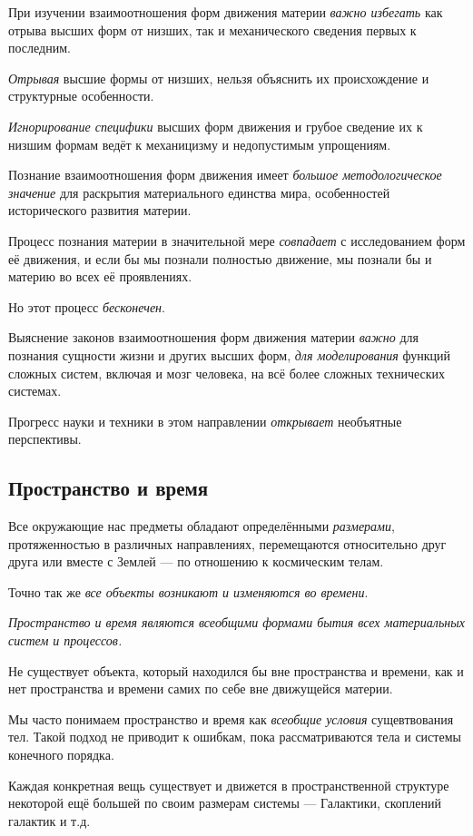 \documentclass[a4paper,14pt,russian]{extreport}
\begin{document}
При изучении взаимоотношения форм движения материи \emph{важно избегать} как отрыва высших форм от низших, так и механического сведения первых к последним.

\emph{Отрывая} высшие формы от низших, нельзя объяснить их происхождение и структурные особенности.

\emph{Игнорирование специфики} высших форм движения и грубое сведение их к низшим формам ведёт к механицизму и недопустимым упрощениям.

Познание взаимоотношения форм движения имеет \emph{большое методологическое значение} для раскрытия материального единства мира, особенностей исторического развития материи.

Процесс познания материи в значительной мере \emph{совпадает} с исследованием форм её движения, и если бы мы познали полностью движение, мы познали бы и материю во всех её проявлениях.

Но этот процесс \emph{бесконечен}.

Выяснение законов взаимоотношения форм движения материи \emph{важно} для познания сущности жизни и других высших форм, \emph{для моделирования} функций сложных систем, включая и мозг человека, на всё более сложных технических системах.

Прогресс науки и техники в этом направлении \emph{открывает} необъятные перспективы.

\subsection{Пространство и время}

Все окружающие нас предметы обладают определёнными \emph{размерами}, протяженностью в различных направлениях, перемещаются относительно друг друга или вместе с Землей --- по отношению к космическим телам.

Точно так же \emph{все объекты возникают и изменяются во времени}.

\emph{Пространство и время являются всеобщими формами бытия всех материальных систем и процессов.}

Не существует объекта, который находился бы вне пространства и времени, как и нет пространства и времени самих по себе вне движущейся материи.

Мы часто понимаем пространство и время как \emph{всеобщие условия} сущевтвования тел. Такой подход не приводит к ошибкам, пока рассматриваются тела и системы конечного порядка.

Каждая конкретная вещь существует и движется в пространственной структуре некоторой ещё большей по своим размерам системы --- Галактики, скоплений галактик и т.д.
\end{document}
